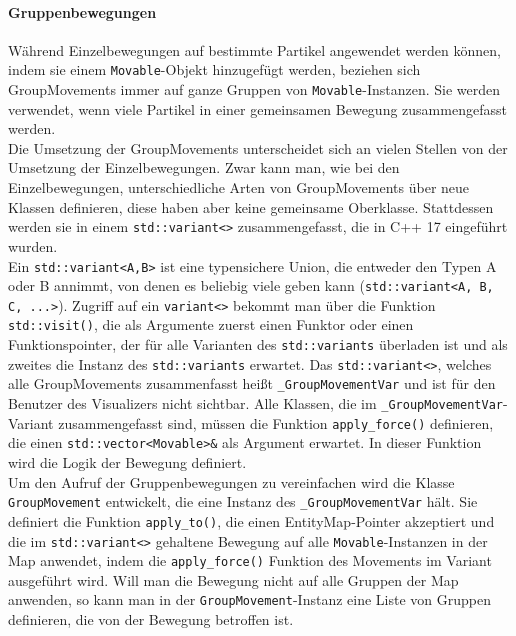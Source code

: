 \documentclass[11pt,a4paper]{article}
\begin{document}
\paragraph{Gruppenbewegungen}
Während Einzelbewegungen auf bestimmte Partikel angewendet werden können, indem sie einem \lstinline!Movable!-Objekt hinzugefügt werden, beziehen sich GroupMovements immer auf ganze Gruppen von \lstinline!Movable!-Instanzen. Sie werden verwendet, wenn viele Partikel in einer gemeinsamen Bewegung zusammengefasst werden.\\
Die Umsetzung der GroupMovements unterscheidet sich an vielen Stellen von der Umsetzung der Einzelbewegungen. Zwar kann man, wie bei den Einzelbewegungen, unterschiedliche Arten von GroupMovements über neue Klassen definieren, diese haben aber keine gemeinsame Oberklasse. Stattdessen werden sie in einem \lstinline!std::variant<>! zusammengefasst, die in C++ 17 eingeführt wurden.\\
Ein \lstinline!std::variant<A,B>! ist eine  typensichere Union, die entweder den Typen A oder B annimmt, von denen es beliebig viele geben kann (\lstinline!std::variant<A, B, C, ...>!). Zugriff auf ein \lstinline!variant<>! bekommt man über die Funktion \lstinline!std::visit()!, die als Argumente zuerst einen Funktor oder einen Funktionspointer, der für alle Varianten des \lstinline!std::variants! überladen ist und als zweites die Instanz des \lstinline!std::variants! erwartet. Das \lstinline!std::variant<>!, welches alle GroupMovements zusammenfasst heißt \lstinline!_GroupMovementVar! und ist für den Benutzer des Visualizers nicht sichtbar. Alle Klassen, die im \lstinline!_GroupMovementVar!-Variant zusammengefasst sind, müssen die Funktion \lstinline!apply_force()! definieren, die einen \lstinline!std::vector<Movable>&! als Argument erwartet. In dieser Funktion wird die Logik der Bewegung definiert.\\
Um den Aufruf der Gruppenbewegungen zu vereinfachen wird die Klasse \lstinline!GroupMovement! entwickelt, die eine Instanz des \lstinline!_GroupMovementVar! hält. Sie definiert die Funktion \lstinline!apply_to()!, die einen EntityMap-Pointer akzeptiert und die im \lstinline!std::variant<>! gehaltene Bewegung auf alle \lstinline!Movable!-Instanzen in der Map anwendet, indem die \lstinline!apply_force()! Funktion des Movements im Variant ausgeführt wird. Will man die Bewegung nicht auf alle Gruppen der Map anwenden, so kann man in der \lstinline!GroupMovement!-Instanz eine Liste von Gruppen definieren, die von der Bewegung betroffen ist.\\
\end{document}
